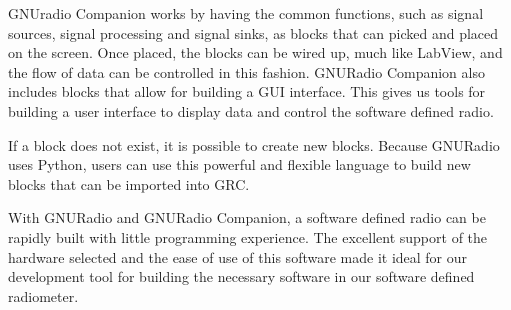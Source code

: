 GNUradio Companion works by having the common functions, such as signal sources, signal processing and signal sinks, as blocks that can picked and placed on the screen.  Once placed, the blocks can be wired up, much like LabView, and the flow of data can be controlled in this fashion.  GNURadio Companion also includes blocks that allow for building a GUI interface.  This gives us tools for building a user interface to display data and control the software defined radio.

If a block does not exist, it is possible to create new blocks.  Because GNURadio uses Python, users can use this powerful and flexible language to build new blocks that can be imported into GRC.  



With GNURadio and GNURadio Companion, a software defined radio can be rapidly built with little programming experience.  The excellent support of the hardware selected and the ease of use of this software made it ideal for our development tool for building the necessary software in our software defined radiometer.





